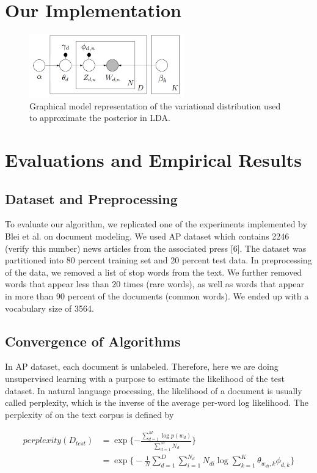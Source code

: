 \documentclass{article} %
\begin{document}
\section{Our Implementation}
\begin{figure}
    \centering
    \includegraphics[width=0.6\textwidth]{vi}
    \caption{Graphical model representation of the variational distribution used to approximate the posterior in LDA.}
    \label{fig:graphmodel}
\end{figure}


\section{Evaluations and Empirical Results}
\subsection{Dataset and Preprocessing}
To evaluate our algorithm, we replicated one of the experiments implemented by Blei et al. on document modeling. We used AP dataset which contains 2246 (verify this number) news articles from the associated press [6]. The dataset was partitioned into 80 percent training set and 20 percent test data. In preprocessing of the data, we removed a list of stop words from the text. We further removed words that appear less than 20 times (rare words), as well as words that appear in more than 90 percent of the documents (common words). We ended up with a vocabulary size of 3564.

\subsection{Convergence of Algorithms}
In AP dataset, each document is unlabeled. Therefore, here we are doing unsupervised learning with a purpose to estimate the likelihood of the test dataset. In natural language processing, the likelihood of a document is usually called perplexity, which is the inverse of the average per-word log likelihood. The perplexity of on the text corpus is defined by

\begin{align*}
perplexity(D_{test}) &= \exp\Big\{{-\frac{\sum_{d=1}^{M} \log{p(w_d)}}{\sum_{d=1}^{M}N_d}}\Big\}\\
& = \exp \Big\{ -\frac{1}{N}\sum_{d=1}^{D}\sum_{i=1}^{N_d}N_{di}\log \sum_{k=1}^{K}\theta_{w_{di}, k}\phi_{d,k} \Big\}
\end{align*}
\end{document}
